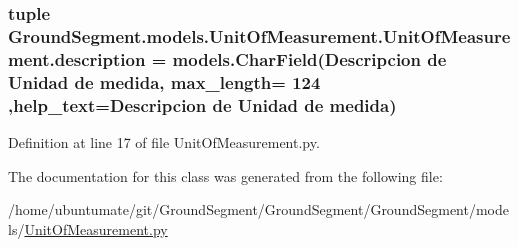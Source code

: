 \subsubsection[{description}]{\setlength{\rightskip}{0pt plus 5cm}tuple Ground\+Segment.\+models.\+Unit\+Of\+Measurement.\+Unit\+Of\+Measurement.\+description = models.\+Char\+Field(\textquotesingle{}Descripcion de Unidad de medida\textquotesingle{}, max\+\_\+length= 124 ,help\+\_\+text=\textquotesingle{}Descripcion de Unidad de medida\textquotesingle{})\hspace{0.3cm}{\ttfamily [static]}}\label{class_ground_segment_1_1models_1_1_unit_of_measurement_1_1_unit_of_measurement_af5e86d6481f747cb195f7532f3e27d21}


Definition at line 17 of file Unit\+Of\+Measurement.\+py.



The documentation for this class was generated from the following file\+:\begin{DoxyCompactItemize}
\item 
/home/ubuntumate/git/\+Ground\+Segment/\+Ground\+Segment/\+Ground\+Segment/models/\hyperlink{_unit_of_measurement_8py}{Unit\+Of\+Measurement.\+py}\end{DoxyCompactItemize}

